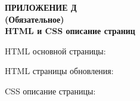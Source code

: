 \clearpage
{}%
\par

\normalsize
\begin{center}
  \textbf{ПРИЛОЖЕНИЕ Д} \\
  \textbf{(Обязательное)} \\
  \textbf{HTML и CSS описание страниц}
\end{center}

HTML основной страницы:



HTML страницы обновления:



CSS описание страницы:



\pdfpagewidth=210mm
\pdfpageheight=297mm
